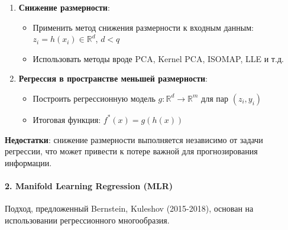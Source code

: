 \documentclass[a4paper,12pt]{article}
\begin{document}
\begin{enumerate}
    \item \textbf{Снижение размерности}:
    \begin{itemize}
        \item Применить метод снижения размерности к входным данным: $z_i = h(x_i) \in \mathbb{R}^d$, $d < q$
        \item Использовать методы вроде PCA, Kernel PCA, ISOMAP, LLE и т.д.
    \end{itemize}

    \item \textbf{Регрессия в пространстве меньшей размерности}:
    \begin{itemize}
        \item Построить регрессионную модель $g: \mathbb{R}^d \rightarrow \mathbb{R}^m$ для пар $(z_i, y_i)$
        \item Итоговая функция: $f^*(x) = g(h(x))$
    \end{itemize}
\end{enumerate}

\textbf{Недостатки}: снижение размерности выполняется независимо от задачи регрессии, что может привести к потере важной для прогнозирования информации.

\paragraph{2. Manifold Learning Regression (MLR)}

Подход, предложенный Bernstein, Kuleshov (2015-2018), основан на использовании регрессионного многообразия.
\end{document}
